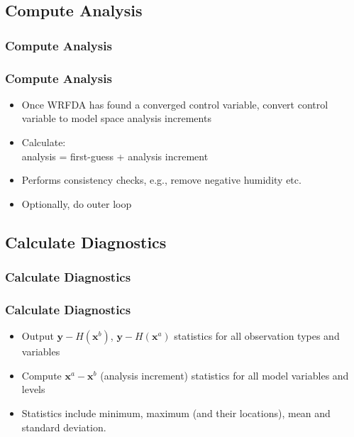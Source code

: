 \documentclass{beamer}
\begin{document}
\subsection{Compute Analysis}
\begin{frame}
\frametitle{Compute Analysis}
\end{frame}

\begin{frame}
\frametitle{Compute Analysis}
\begin{itemize}
\item Once WRFDA has found a converged control variable, convert control variable to model space analysis increments \pause
\item Calculate:\\ 
            analysis = first-guess + analysis increment \pause
\item Performs consistency checks, e.g., remove negative humidity etc. \pause 
\item Optionally, do outer loop
\end{itemize}
\end{frame}

\subsection{Calculate Diagnostics}
\begin{frame}
\frametitle{Calculate Diagnostics}
\end{frame}

\begin{frame}
\frametitle{Calculate Diagnostics}
\begin{itemize}
\item Output $\mathbf{y}-H(\mathbf{x}^b)$, $\mathbf{y}-H(\mathbf{x}^a)$ statistics for all observation types and variables \pause
\item Compute $\mathbf{x}^a-\mathbf{x}^b$ (analysis increment) statistics for all model variables and levels \pause
\item Statistics include minimum, maximum (and their locations), mean and standard deviation.
\end{itemize}
\end{frame}
\end{document}
